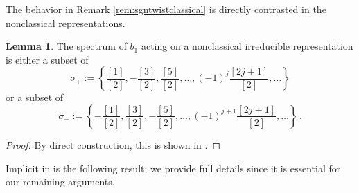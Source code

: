 \documentclass[10pt]{amsart}
\numberwithin{equation}{section}
\theoremstyle{definition}
\newtheorem{lem}[thm]{Lemma}
\begin{document}
The behavior in Remark \ref{rem:sgntwistclassical} is directly contrasted in the nonclassical representations.

\begin{lem}\label{lem:sigmaplusorminus}
The spectrum of $b_1$ acting on a 
nonclassical irreducible representation is either a subset of 
\begin{equation}\label{eq:type+}
\sigma_{+} :=
\left\{\frac{[1]}{[2]}, -\frac{[3]}{[2]}, \frac{[5]}{[2]}, \dots, (-1)^{j}\frac{[2j+1]}{[2]}, \dots\right\}
\end{equation}
or a subset of 
\begin{equation}\label{eq:type-}
\sigma_{-} :=
\left\{-\frac{[1]}{[2]}, \frac{[3]}{[2]}, -\frac{[5]}{[2]}, \dots, (-1)^{j+1}\frac{[2j+1]}{[2]}, \dots\right\} \, .
\end{equation}
\end{lem}
\begin{proof}
By direct construction, this is shown in \cite{MR2143754}. 
\end{proof}

Implicit in \cite{MR2143754} is the following result; 
we provide full details since it is essential for our remaining arguments.
\end{document}
